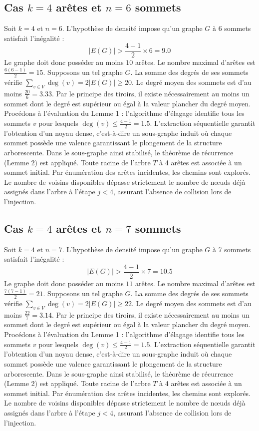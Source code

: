 \documentclass[12pt,a4paper]{article}
\begin{document}
\subsection{Cas $k = 4$ arêtes et $n = 6$ sommets}
Soit $k = 4$ et $n = 6$. L'hypothèse de densité impose qu'un graphe $G$ à 6 sommets satisfait l'inégalité :
$$ |E(G)| > \frac{4-1}{2} \times 6 = 9.0 $$
Le graphe doit donc posséder au moins $10$ arêtes. Le nombre maximal d'arêtes est $\frac{6(6-1)}{2} = 15$.
Supposons un tel graphe $G$. La somme des degrés de ses sommets vérifie $\sum_{v \in V} \deg(v) = 2|E(G)| \geq 20$.
Le degré moyen des sommets est d'au moins $\frac{20}{6} = 3.33$.
Par le principe des tiroirs, il existe nécessairement au moins un sommet dont le degré est supérieur ou égal à la valeur plancher du degré moyen.
Procédons à l'évaluation du Lemme 1 : l'algorithme d'élagage identifie tous les sommets $v$ pour lesquels $\deg(v) \leq \frac{4-1}{2} = 1.5$.
L'extraction séquentielle garantit l'obtention d'un noyau dense, c'est-à-dire un sous-graphe induit où chaque sommet possède une valence garantissant le plongement de la structure arborescente.
Dans le sous-graphe ainsi stabilisé, le théorème de récurrence (Lemme 2) est appliqué. Toute racine de l'arbre $T$ à 4 arêtes est associée à un sommet initial. Par énumération des arêtes incidentes, les chemins sont explorés. Le nombre de voisins disponibles dépasse strictement le nombre de nœuds déjà assignés dans l'arbre à l'étape $j < 4$, assurant l'absence de collision lors de l'injection.

\subsection{Cas $k = 4$ arêtes et $n = 7$ sommets}
Soit $k = 4$ et $n = 7$. L'hypothèse de densité impose qu'un graphe $G$ à 7 sommets satisfait l'inégalité :
$$ |E(G)| > \frac{4-1}{2} \times 7 = 10.5 $$
Le graphe doit donc posséder au moins $11$ arêtes. Le nombre maximal d'arêtes est $\frac{7(7-1)}{2} = 21$.
Supposons un tel graphe $G$. La somme des degrés de ses sommets vérifie $\sum_{v \in V} \deg(v) = 2|E(G)| \geq 22$.
Le degré moyen des sommets est d'au moins $\frac{22}{7} = 3.14$.
Par le principe des tiroirs, il existe nécessairement au moins un sommet dont le degré est supérieur ou égal à la valeur plancher du degré moyen.
Procédons à l'évaluation du Lemme 1 : l'algorithme d'élagage identifie tous les sommets $v$ pour lesquels $\deg(v) \leq \frac{4-1}{2} = 1.5$.
L'extraction séquentielle garantit l'obtention d'un noyau dense, c'est-à-dire un sous-graphe induit où chaque sommet possède une valence garantissant le plongement de la structure arborescente.
Dans le sous-graphe ainsi stabilisé, le théorème de récurrence (Lemme 2) est appliqué. Toute racine de l'arbre $T$ à 4 arêtes est associée à un sommet initial. Par énumération des arêtes incidentes, les chemins sont explorés. Le nombre de voisins disponibles dépasse strictement le nombre de nœuds déjà assignés dans l'arbre à l'étape $j < 4$, assurant l'absence de collision lors de l'injection.
\end{document}
